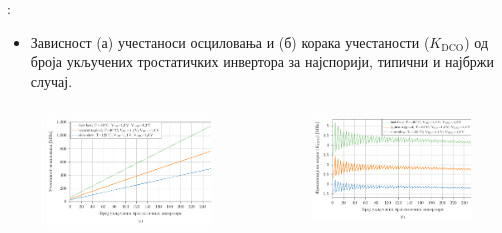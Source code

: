 \documentclass[aspectratio=169]{beamer}
\begin{document}
\begin{frame}{\secname: \subsecname}
    \small
    \vspace{-0.5cm}
    \begin{itemize}
        \item Зависност (а) учестаноси осциловања и (б) корака учестаности ($K_\text{DCO}$) од броја укључених тростатичких инвертора за најспорији, типични и најбржи случај.
    \end{itemize}
    \begin{columns}[t]
        \begin{column}{0.5\textwidth}
            \begin{figure}[!t]
            	\centering
            	\includegraphics[scale=0.52]{slike/prezentacija/sim_DCO_worst_typical_best_freq.pdf}
            	\label{DCO_worst_typical_best_freq}
            \end{figure}
		\end{column}
		\begin{column}{0.5\textwidth}
            \vspace{0.1cm}
            \begin{figure}[!t]
                \includegraphics[scale=0.52]{slike/prezentacija/sim_DCO_worst_typical_best_kdco.pdf}
                \label{DCO_worst_typical_best_kdco}
            \end{figure}
		\end{column}
	\end{columns}
\end{frame}
\end{document}
